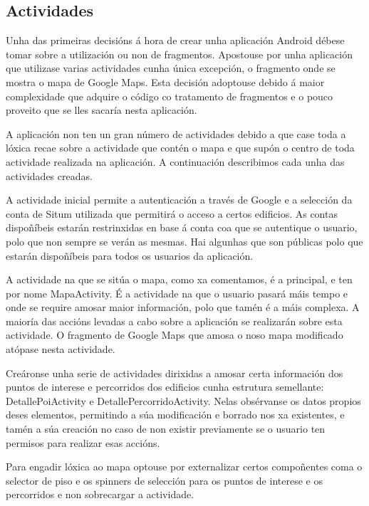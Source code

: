 \subsection{Actividades}
Unha das primeiras decisións á hora de crear unha aplicación Android débese tomar sobre a utilización ou non de fragmentos. Apostouse por unha aplicación que utilizase varias actividades cunha única excepción, o fragmento onde se mostra o mapa de Google Maps. Esta decisión adoptouse debido á maior complexidade que adquire o código co tratamento de fragmentos e o pouco proveito que se lles sacaría nesta aplicación.

A aplicación non ten un gran número de actividades debido a que case toda a lóxica recae sobre a actividade que contén o mapa e que supón o centro de toda actividade realizada na aplicación. A continuación describimos cada unha das actividades creadas.

A actividade inicial permite a autenticación a través de Google e a selección da conta de Situm utilizada que permitirá o acceso a certos edificios. As contas dispoñíbeis estarán restrinxidas en base á conta coa que se autentique o usuario, polo que non sempre se verán as mesmas. Hai algunhas que son públicas polo que estarán dispoñíbeis para todos os usuarios da aplicación.

A actividade na que se sitúa o mapa, como xa comentamos, é a principal, e ten por nome MapaActivity. É a actividade na que o usuario pasará máis tempo e onde se require amosar maior información, polo que tamén é a máis complexa. A maioría das accións levadas a cabo sobre a aplicación se realizarán sobre esta actividade. O fragmento de Google Maps que amosa o noso mapa modificado atópase nesta actividade.

Creáronse unha serie de actividades dirixidas a amosar certa información dos puntos de interese e percorridos dos edificios cunha estrutura semellante: DetallePoiActivity e DetallePercorridoActivity. Nelas obsérvanse os datos propios deses elementos, permitindo a súa modificación e borrado nos xa existentes, e tamén a súa creación no caso de non existir previamente se o usuario ten permisos para realizar esas accións.

Para engadir lóxica ao mapa optouse por externalizar certos compoñentes coma o selector de piso e os spinners de selección para os puntos de interese e os percorridos e non sobrecargar a actividade.



